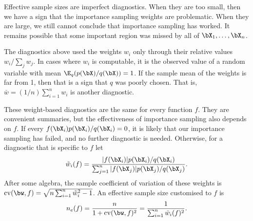 Effective sample sizes are imperfect diagnostics. When they are too small, then we have a sign that the importance sampling weights are problematic. When they are large, we still cannot conclude that importance sampling has worked. It remains possible that some important region was missed by all of \(\bX_1, \dots, \bX_n\).

The diagnostics above used the weights \(w_i\) only through their relative values \(w_i / \sum_j w_j\). In cases where \(w_i\) is computable, it is the observed value of a random variable with mean \(\E_q(p(\bX)/q(\bX)) = 1\). If the sample mean of the weights is far from 1, then that is a sign that \(q\) was poorly chosen. That is, \(\bar{w} = (1/n) \sum_{i=1}^n w_i\) is another diagnostic.

These weight-based diagnostics are the same for every function \(f\). They are convenient summaries, but the effectiveness of importance sampling also depends on \(f\). If every \(f(\bX_i)p(\bX_i)/q(\bX_i) = 0\), it is likely that our importance sampling has failed, and no further diagnostic is needed. Otherwise, for a diagnostic that is specific to \(f\) let
\[
	\tilde{w}_i(f) = \frac{|f(\bX_i)|p(\bX_i)/q(\bX_i)}{\sum_{j=1}^n |f(\bX_j)|p(\bX_j)/q(\bX_j)}.
\]
After some algebra, the sample coefficient of variation of these weights is \(\mathrm{cv}(\bw, f) = \sqrt{n \sum_{i=1}^n \tilde{w}_i^2 - 1}\). An effective sample size customised to \(f\) is
\begin{equation}
	n_e(f) = \frac{n}{1 + \mathrm{cv}(\bw, f)^2} = \frac{1}{\sum_{i=1}^n \tilde{w}_i(f)^2}.
	\label{eq:ESSFunctionSpecific}
\end{equation}
